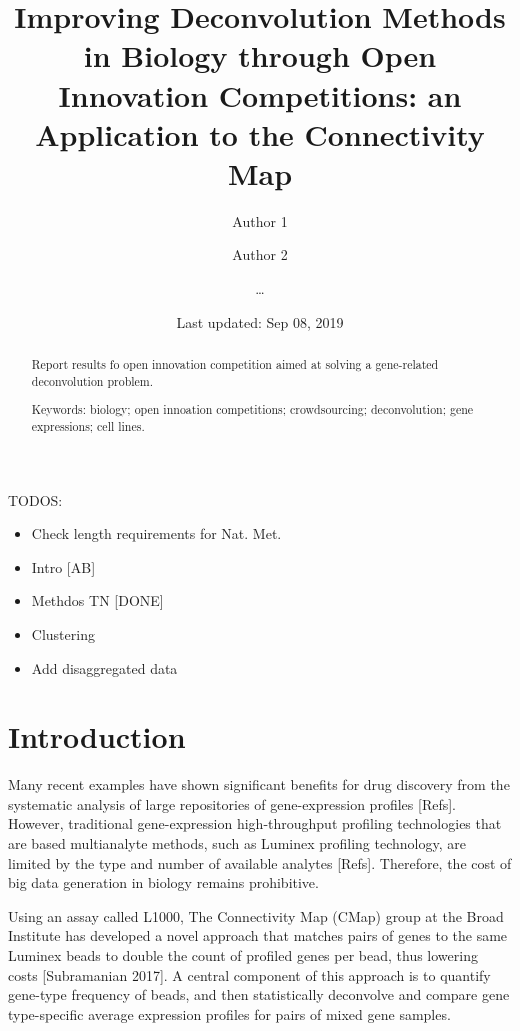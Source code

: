 \documentclass[]{article}
\title{Improving Deconvolution Methods in Biology through Open Innovation
Competitions: an Application to the Connectivity Map}
\author{Author 1 \and Author 2 \and \ldots{}}
\date{Last updated: Sep 08, 2019}
\providecommand{\tightlist}{%
  \setlength{\itemsep}{0pt}\setlength{\parskip}{0pt}}
\begin{document}
\maketitle
\begin{abstract}
Report results fo open innovation competition aimed at solving a
gene-related deconvolution problem.


\smallskip\noindent 
Keywords: biology; open innoation competitions; crowdsourcing; deconvolution; gene expressions; cell lines.
\end{abstract}

{
\setcounter{tocdepth}{2}
\newpage
\tableofcontents
\newpage
}
\color{red}

TODOS:

\begin{itemize}
\tightlist
\item
  Check length requirements for Nat. Met.
\item
  Intro {[}AB{]}
\item
  Methdos TN {[}DONE{]}
\item
  Clustering
\item
  Add disaggregated data
\end{itemize}

\color{black}

\hypertarget{introduction}{%
\section{Introduction}\label{introduction}}

Many recent examples have shown significant benefits for drug discovery
from the systematic analysis of large repositories of gene-expression
profiles {[}Refs{]}. However, traditional gene-expression
high-throughput profiling technologies that are based multianalyte
methods, such as Luminex profiling technology, are limited by the type
and number of available analytes {[}Refs{]}. Therefore, the cost of big
data generation in biology remains prohibitive.

Using an assay called L1000, The Connectivity Map (CMap) group at the
Broad Institute has developed a novel approach that matches pairs of
genes to the same Luminex beads to double the count of profiled genes
per bead, thus lowering costs {[}Subramanian 2017{]}. A central
component of this approach is to quantify gene-type frequency of beads,
and then statistically deconvolve and compare gene type-specific average
expression profiles for pairs of mixed gene samples.
\end{document}
